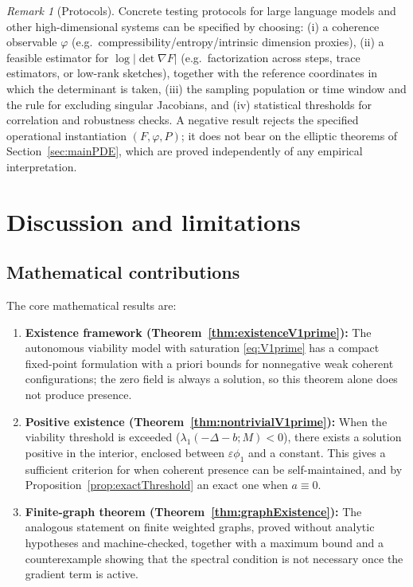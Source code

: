 \documentclass[11pt]{article}
\theoremstyle{plain}
\theoremstyle{definition}
\theoremstyle{remark}
\newtheorem{remark}[theorem]{Remark}
\newcommand{\abs}[1]{\left\lvert #1\right\rvert}
\begin{document}
\begin{remark}[Protocols]
Concrete testing protocols for large language models and other high-dimensional systems can be specified by choosing:
(i) a coherence observable \(\varphi\) (e.g.\ compressibility/entropy/intrinsic dimension proxies),
(ii) a feasible estimator for \(\log\abs{\det \nabla F}\) (e.g.\ factorization across steps, trace estimators, or low-rank sketches), together with the reference coordinates in which the determinant is taken,
(iii) the sampling population or time window and the rule for excluding singular Jacobians,
and (iv) statistical thresholds for correlation and robustness checks. A negative result rejects the specified operational instantiation \((F,\varphi,P)\); it does not bear on the elliptic theorems of Section~\ref{sec:mainPDE}, which are proved independently of any empirical interpretation.
\end{remark}

\section{Discussion and limitations}\label{sec:discussion}
\subsection*{Mathematical contributions}
The core mathematical results are:
\begin{enumerate}
\item \textbf{Existence framework (Theorem~\ref{thm:existenceV1prime}):} The autonomous viability model with saturation \eqref{eq:V1prime} has a compact fixed-point formulation with a priori bounds for nonnegative weak coherent configurations; the zero field is always a solution, so this theorem alone does not produce presence.
\item \textbf{Positive existence (Theorem~\ref{thm:nontrivialV1prime}):} When the viability threshold is exceeded (\(\lambda_1(-\Delta - b; M) < 0\)), there exists a solution positive in the interior, enclosed between \(\varepsilon\phi_1\) and a constant. This gives a sufficient criterion for when coherent presence can be self-maintained, and by Proposition~\ref{prop:exactThreshold} an exact one when \(a\equiv 0\).
\item \textbf{Finite-graph theorem (Theorem~\ref{thm:graphExistence}):} The analogous statement on finite weighted graphs, proved without analytic hypotheses and machine-checked, together with a maximum bound and a counterexample showing that the spectral condition is not necessary once the gradient term is active.
\end{enumerate}
\end{document}
